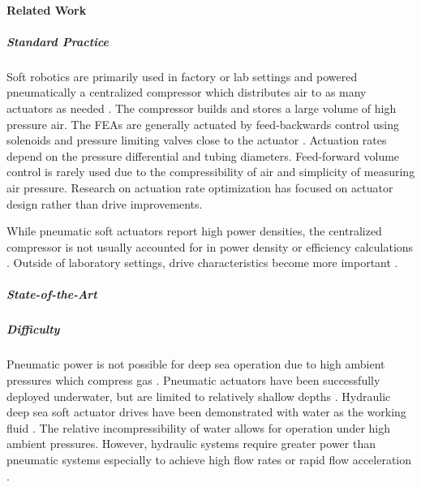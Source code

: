 \hypertarget{ch1:related-work}{%
\paragraph{Related Work}\label{ch1:related-work}}

\hypertarget{ch1:standard-practice}{%
\subparagraph{Standard Practice}\label{ch1:standard-practice}}

Soft robotics are primarily used in factory or lab settings and powered
pneumatically a centralized compressor which distributes air to as many
actuators as needed \cite{xavier2022soft, walker2020soft}. 
The compressor builds and stores a large volume of high pressure air. 
The \glspl{FEA} are generally actuated by feed-backwards control 
using solenoids and pressure limiting valves close to the actuator \cite{walker2020soft}. Actuation rates depend on the pressure differential and tubing diameters. 
Feed-forward volume control is rarely used due to the compressibility of air
and simplicity of measuring air pressure. 
Research on actuation rate optimization has focused on actuator design \cite{xavier2022soft} 
rather than drive improvements.

While pneumatic soft actuators report high power densities, the
centralized compressor is not usually accounted for in power density or
efficiency calculations \cite{wehner2014pneumatic}. Outside of laboratory settings, drive
characteristics become more important \cite{tolleymichael2014resilient}.



\hypertarget{ch1:state-of-the-art}{%
\subparagraph{State-of-the-Art}\label{ch1:state-of-the-art}}

\hypertarget{ch1:difficulty}{%
\subparagraph{Difficulty}\label{ch1:difficulty}}

Pneumatic power is not possible for deep sea operation 
due to high ambient pressures which compress gas \cite{gruber2022advances}. 
Pneumatic actuators have been successfully deployed underwater, 
but are limited to relatively shallow depths \cite{gruber2022advances}.
Hydraulic deep sea soft actuator drives have been demonstrated 
with water as the working fluid \cite{chen2021water}. 
The relative incompressibility of water allows for operation under high ambient pressures.  
However, hydraulic systems require greater power than pneumatic systems
especially to achieve high flow rates or rapid flow acceleration
\cite{xavier2022soft}.

